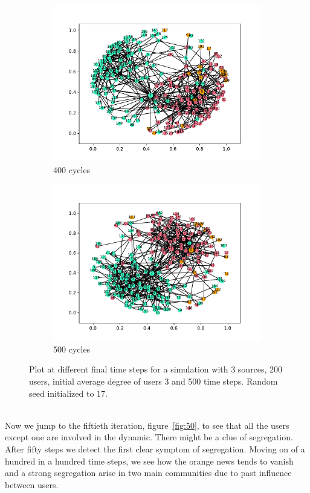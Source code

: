 \begin{figure}[htpb]
  \begin{subfigure}[t]{.45\textwidth}
    \centering
    \includegraphics[trim={1cm .5cm 1cm 1cm}, clip, width=\linewidth]{img/pdf/plot-0400.pdf} 
    \caption{400 cycles}
    \label{fig:400}
  \end{subfigure}
  \begin{subfigure}[t]{.45\textwidth}
    \centering
    \includegraphics[trim={1cm .5cm 1cm 1cm}, clip, width=\linewidth]{img/pdf/plot-0500.pdf} 
    \caption{500 cycles}
    \label{fig:500}
  \end{subfigure}
 
  \caption{Plot at different final time steps for a simulation with 3 sources, 200 users, initial average degree of users 3 and 500 time steps. Random seed initialized to 17.}
\end{figure}\\
Now we jump to the fiftieth iteration, figure~\ref{fig:50}, to see that
all the users except one are involved in the dynamic. There might be a
clue of segregation.
After fifty steps we detect the first clear symptom of segregation.
Moving on of a hundred in a hundred time steps, we see how the orange news
tends to vanish and a strong segregation arise in two main communities
due to past influence between users.
